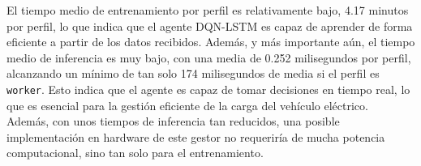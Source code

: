 El tiempo medio de entrenamiento por perfil es relativamente bajo, 4.17 minutos por perfil, lo que 
indica que el agente DQN-LSTM es capaz de aprender de forma eficiente a partir de los datos 
recibidos. Además, y más importante aún, el tiempo medio de inferencia es muy bajo, con una media 
de 0.252 milisegundos por perfil, alcanzando un mínimo de tan solo 174 milisegundos de media si el perfil es 
\texttt{worker}. Esto indica que el agente es capaz de tomar decisiones en tiempo real, lo que es 
esencial para la gestión eficiente de la carga del vehículo eléctrico.\\

Además, con unos tiempos de inferencia tan reducidos, una posible implementación en hardware de 
este gestor no requeriría de mucha potencia computacional, sino tan solo para el entrenamiento.
